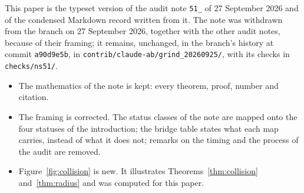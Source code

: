This paper is the typeset version of the audit note \texttt{51\_} of 27 September 2026 and of the condensed Markdown record written from it. The note was withdrawn from the branch on 27 September 2026, together with the other audit notes, because of their framing; it remains, unchanged, in the branch's history at commit \texttt{a90d9e5b}, in \texttt{contrib/claude-ab/grind\_20260925/}, with its checks in \texttt{checks/ns51/}.
\begin{itemize}
\item The mathematics of the note is kept: every theorem, proof, number and citation.
\item The framing is corrected. The status classes of the note are mapped onto the four statuses of the introduction; the bridge table states what each map carries, instead of what it does not; remarks on the timing and the process of the audit are removed.
\item Figure~\ref{fig:collision} is new. It illustrates Theorems~\ref{thm:collision} and~\ref{thm:radius} and was computed for this paper.
\end{itemize}
